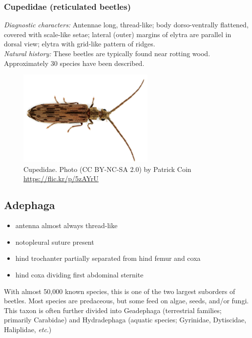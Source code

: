 \documentclass[letterpaper, 11pt]{article}
\begin{document}
\subsubsection{Cupedidae (reticulated beetles)}
\noindent{}\textit{Diagnostic characters:} Antennae long, thread-like; body dorso-ventrally flattened, covered with scale-like setae; lateral (outer) margins of elytra are parallel in dorsal view; elytra with grid-like pattern of ridges.\\

\noindent{}\textit{Natural history:} These beetles are typically found near rotting wood. Approximately 30 species have been described.

\begin{figure}[ht!]
  \centering
    \includegraphics[width=0.6\textwidth]{CupedidHabitus}
  \caption{Cupedidae. Photo (CC BY-NC-SA 2.0) by Patrick Coin \url{https://flic.kr/p/5zAYrU}}
  \label{fig:cupedid}
\end{figure}

\subsection{Adephaga}
\begin{itemize}
\item antenna almost always thread-like
\item notopleural suture present 
\item hind trochanter partially separated from hind femur and coxa %
\item hind coxa dividing first abdominal sternite
\end{itemize}
With almost 50,000 known species, this is one of the two largest suborders of beetles. Most species are predaceous, but some feed on algae, seeds, and/or fungi. This taxon is often further divided into Geadephaga (terrestrial families; primarily Carabidae) and Hydradephaga (aquatic species; Gyrinidae, Dytiscidae, Haliplidae, \textit{etc}.) 
\end{document}
